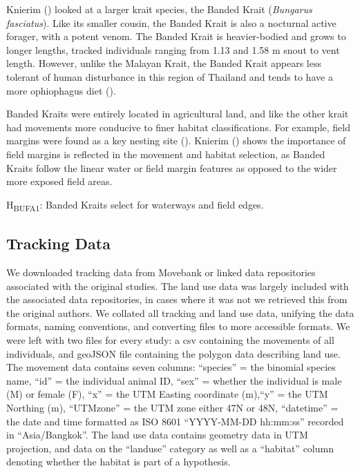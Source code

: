 \documentclass[10pt,a4paper]{article}
\begin{document}
Knierim () looked at a larger krait species, the Banded Krait (\emph{Bungarus fasciatus}).
Like its smaller cousin, the Banded Krait is also a nocturnal active forager, with a potent venom.
The Banded Krait is heavier-bodied and grows to longer lengths, tracked individuals ranging from 1.13 and 1.58 m snout to vent length.
However, unlike the Malayan Krait, the Banded Krait appears less tolerant of human disturbance in this region of Thailand and tends to have a more ophiophagus diet ().

Banded Kraits were entirely located in agricultural land, and like the other krait had movements more conducive to finer habitat classifications.
For example, field margins were found as a key nesting site ().
Knierim () shows the importance of field margins is reflected in the movement and habitat selection, as Banded Kraits follow the linear water or field margin features as opposed to the wider more exposed field areas.

H\textsubscript{BUFA1}: Banded Kraits select for waterways and field edges.

\subsection{Tracking Data}\label{tracking-data}

We downloaded tracking data from Movebank or linked data repositories associated with the original studies.
The land use data was largely included with the associated data repositories, in cases where it was not we retrieved this from the original authors.
We collated all tracking and land use data, unifying the data formats, naming conventions, and converting files to more accessible formats.
We were left with two files for every study: a csv containing the movements of all individuals, and geoJSON file containing the polygon data describing land use.
The movement data contains seven columns: ``species'' = the binomial species name, ``id'' = the individual animal ID, ``sex'' = whether the individual is male (M) or female (F), ``x'' = the UTM Easting coordinate (m),``y'' = the UTM Northing (m), ``UTMzone'' = the UTM zone either 47N or 48N, ``datetime'' = the date and time formatted as ISO 8601 ``YYYY-MM-DD hh:mm:ss'' recorded in ``Asia/Bangkok''.
The land use data contains geometry data in UTM projection, and data on the ``landuse'' category as well as a ``habitat'' column denoting whether the habitat is part of a hypothesis.
\end{document}
